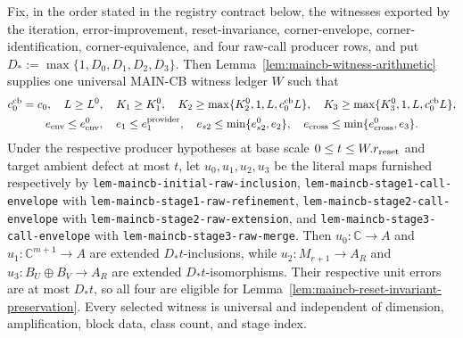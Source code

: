 \begin{lemma}\label{lem:maincb-reset-constant-ledger}
Fix, in the order stated in the registry contract below, the witnesses exported by the
iteration, error-improvement, reset-invariance, corner-envelope, corner-identification,
corner-equivalence, and four raw-call producer rows, and put
$D_*:=\max\{1,D_0,D_1,D_2,D_3\}$.  Then Lemma~\ref{lem:maincb-witness-arithmetic}
supplies one universal MAIN-CB witness ledger $W$ such that
\[
\begin{gathered}
 c_0^{\rm cb}=c_0,\quad L\ge L^0,\quad K_1\ge K_1^0,\quad
 K_2\ge\max\{K_2^0,1,L,c_0^{\rm cb}L\},\quad K_3\ge\max\{K_3^0,1,L,c_0^{\rm cb}L\},\\
 e_{\rm env}\le e_{\rm env}^0,\quad e_1\le e_1^{\rm provider},\quad
 e_{s2}\le\min\{e_{s2}^0,e_2\},\quad e_{\rm cross}\le\min\{e_{\rm cross}^0,e_3\}.
\end{gathered}
\]
Under the respective producer hypotheses at base scale $0\le t\le W.r_{\rm reset}$ and target ambient defect at most $t$, let $u_0,u_1,u_2,u_3$ be the literal maps furnished respectively by \texttt{lem-maincb-initial-raw-inclusion}, \texttt{lem-maincb-stage1-call-envelope} with \texttt{lem-maincb-stage1-raw-refinement}, \texttt{lem-maincb-stage2-call-envelope} with \texttt{lem-maincb-stage2-raw-extension}, and \texttt{lem-maincb-stage3-call-envelope} with \texttt{lem-maincb-stage3-raw-merge}. Then $u_0:\mathbb C\to A$ and $u_1:\mathbb C^{m+1}\to A$ are extended $D_*t$-inclusions, while $u_2:M_{r+1}\to A_R$ and $u_3:B_U\oplus B_V\to A_R$ are extended $D_*t$-isomorphisms.  Their respective unit
errors are at most $D_*t$, so all four are eligible for
Lemma~\ref{lem:maincb-reset-invariant-preservation}.  Every selected witness is universal
and independent of dimension, amplification, block data, class count, and stage index.
\end{lemma}

